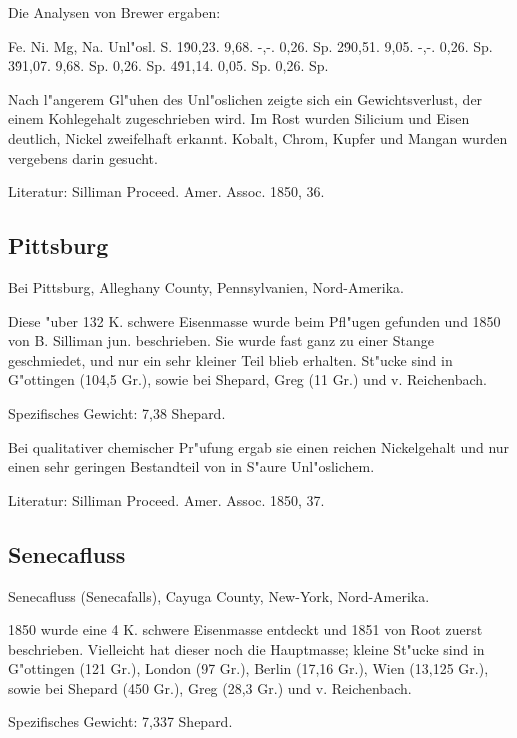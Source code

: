 \documentclass[a4paper, 11pt, oneside]{article}
\begin{document}
Die Analysen von Brewer ergaben:

Fe. Ni. Mg, Na. Unl"osl. S.  
1\. 90,23. 9,68. -,-. 0,26. Sp.  
2\. 90,51. 9,05. -,-. 0,26. Sp.  
3\. 91,07. 9,68. Sp. 0,26. Sp.  
4\. 91,14. 0,05. Sp. 0,26. Sp.

Nach l"angerem Gl"uhen des Unl"oslichen zeigte sich ein Gewichtsverlust, der einem Kohlegehalt zugeschrieben wird. Im Rost wurden Silicium und Eisen deutlich, Nickel zweifelhaft erkannt. Kobalt, Chrom, Kupfer und Mangan wurden vergebens darin gesucht.

Literatur: Silliman Proceed. Amer. Assoc. 1850, 36.

\subsection{Pittsburg}

Bei Pittsburg, Alleghany County, Pennsylvanien, Nord-Amerika.

Diese "uber 132 K. schwere Eisenmasse wurde beim Pfl"ugen gefunden und 1850 von B. Silliman jun. beschrieben. Sie wurde fast ganz zu einer Stange geschmiedet, und nur ein sehr kleiner Teil blieb erhalten. St"ucke sind in G"ottingen (104,5 Gr.), sowie bei Shepard, Greg (11 Gr.) und v. Reichenbach.

Spezifisches Gewicht: 7,38 Shepard.

Bei qualitativer chemischer Pr"ufung ergab sie einen reichen Nickelgehalt und nur einen sehr geringen Bestandteil von in S"aure Unl"oslichem.

Literatur: Silliman Proceed. Amer. Assoc. 1850, 37.

\subsection{Senecafluss}

Senecafluss (Senecafalls), Cayuga County, New-York, Nord-Amerika.

1850 wurde eine 4 K. schwere Eisenmasse entdeckt und 1851 von Root zuerst beschrieben. Vielleicht hat dieser noch die Hauptmasse; kleine St"ucke sind in G"ottingen (121 Gr.), London (97 Gr.), Berlin (17,16 Gr.), Wien (13,125 Gr.), sowie bei Shepard (450 Gr.), Greg (28,3 Gr.) und v. Reichenbach.

Spezifisches Gewicht: 7,337 Shepard.
\end{document}
